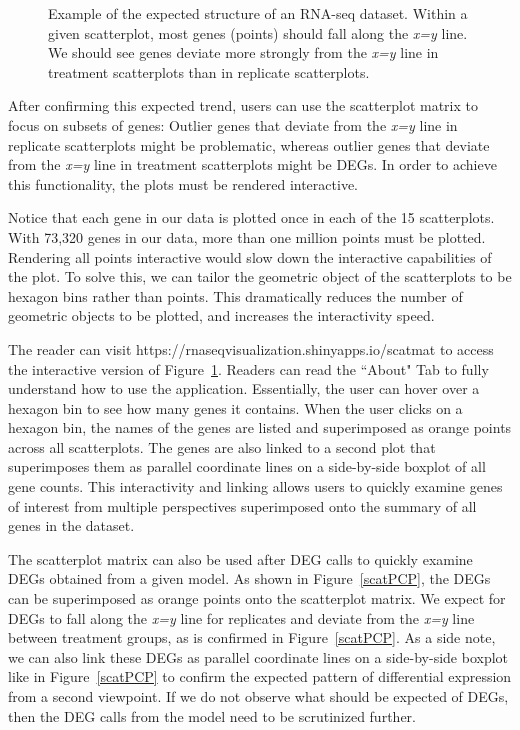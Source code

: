\documentclass[referee]{biom}
\begin{document}
\begin{figure}
\begin{center}
\centerline{}
\end{center}
\caption{Example of the expected structure of an RNA-seq dataset. Within a given scatterplot, most genes (points) should fall along the \textit{x=y} line. We should see genes deviate more strongly from the \textit{x=y} line in treatment scatterplots than in replicate scatterplots.
\label{cotyIdeal}}
\end{figure}

After confirming this expected trend, users can use the scatterplot matrix to focus on subsets of genes: Outlier genes that deviate from the \textit{x=y} line in replicate scatterplots might be problematic, whereas outlier genes that deviate from the \textit{x=y} line in treatment scatterplots might be DEGs. In order to achieve this functionality, the plots must be rendered interactive.

Notice that each gene in our data is plotted once in each of the 15 scatterplots. With 73,320 genes in our data, more than one million points must be plotted. Rendering all points interactive would slow down the interactive capabilities of the plot. To solve this, we can tailor the geometric object of the scatterplots to be hexagon bins rather than points. This dramatically reduces the number of geometric objects to be plotted, and increases the interactivity speed.

The reader can visit https://rnaseqvisualization.shinyapps.io/scatmat to access the interactive version of Figure~\ref{cotyIdeal}. Readers can read the ``About" Tab to fully understand how to use the application. Essentially, the user can hover over a hexagon bin to see how many genes it contains. When the user clicks on a hexagon bin, the names of the genes are listed and superimposed as orange points across all scatterplots. The genes are also linked to a second plot that superimposes them as parallel coordinate lines on a side-by-side boxplot of all gene counts. This interactivity and linking allows users to quickly examine genes of interest from multiple perspectives superimposed onto the summary of all genes in the dataset. 

The scatterplot matrix can also be used after DEG calls to quickly examine DEGs obtained from a given model. As shown in Figure~\ref{scatPCP}, the DEGs can be superimposed as orange points onto the scatterplot matrix. We expect for DEGs to fall along the \textit{x=y} line for replicates and deviate from the \textit{x=y} line between treatment groups, as is confirmed in Figure~\ref{scatPCP}. As a side note, we can also link these DEGs as parallel coordinate lines on a side-by-side boxplot like in Figure~\ref{scatPCP} to confirm the expected pattern of differential expression from a second viewpoint. If we do not observe what should be expected of DEGs, then the DEG calls from the model need to be scrutinized further.
\end{document}
